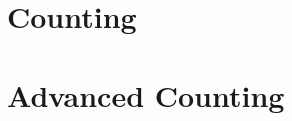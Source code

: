\documentclass[12pt, a4paper, twoside]{article}%
\title{\mytitle}
\author{Naman Kumar}
\numberwithin{equation}{section}
\begin{document}
	\maketitle
	\pagestyle{fancy}
	\begin{abstract}
		 The following document contains solutions to selected problems in the book `Extremal Combinatorics' by Stasys Jukna. Some problems which are either trivial or require nothing more than brute force/proof mirroring have been omitted.
	\end{abstract}

	\newpage
	\tableofcontents
	\newpage
	
	
	\section{Counting}
	\label{sec:counting}
	
	
	\newpage
	
	\section{Advanced Counting}
	\label{sec:advcounting}
	



\end{document}
